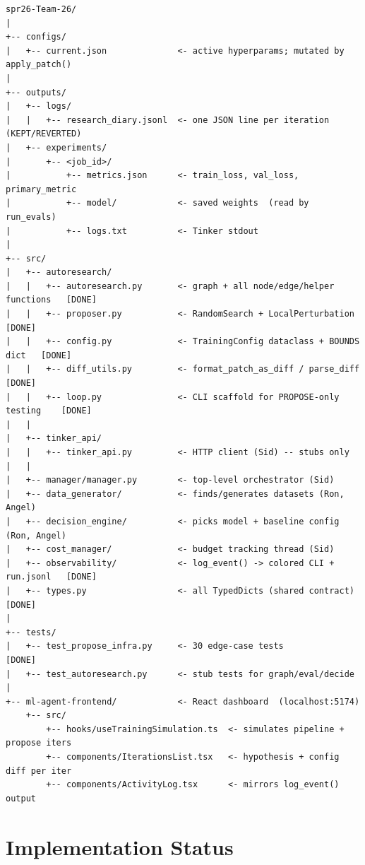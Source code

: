 \documentclass[11pt, letterpaper]{article}
\begin{document}
\begin{verbatim}
spr26-Team-26/
|
+-- configs/
|   +-- current.json              <- active hyperparams; mutated by apply_patch()
|
+-- outputs/
|   +-- logs/
|   |   +-- research_diary.jsonl  <- one JSON line per iteration (KEPT/REVERTED)
|   +-- experiments/
|       +-- <job_id>/
|           +-- metrics.json      <- train_loss, val_loss, primary_metric
|           +-- model/            <- saved weights  (read by run_evals)
|           +-- logs.txt          <- Tinker stdout
|
+-- src/
|   +-- autoresearch/
|   |   +-- autoresearch.py       <- graph + all node/edge/helper functions   [DONE]
|   |   +-- proposer.py           <- RandomSearch + LocalPerturbation         [DONE]
|   |   +-- config.py             <- TrainingConfig dataclass + BOUNDS dict   [DONE]
|   |   +-- diff_utils.py         <- format_patch_as_diff / parse_diff        [DONE]
|   |   +-- loop.py               <- CLI scaffold for PROPOSE-only testing    [DONE]
|   |
|   +-- tinker_api/
|   |   +-- tinker_api.py         <- HTTP client (Sid) -- stubs only
|   |
|   +-- manager/manager.py        <- top-level orchestrator (Sid)
|   +-- data_generator/           <- finds/generates datasets (Ron, Angel)
|   +-- decision_engine/          <- picks model + baseline config (Ron, Angel)
|   +-- cost_manager/             <- budget tracking thread (Sid)
|   +-- observability/            <- log_event() -> colored CLI + run.jsonl   [DONE]
|   +-- types.py                  <- all TypedDicts (shared contract)         [DONE]
|
+-- tests/
|   +-- test_propose_infra.py     <- 30 edge-case tests                       [DONE]
|   +-- test_autoresearch.py      <- stub tests for graph/eval/decide
|
+-- ml-agent-frontend/            <- React dashboard  (localhost:5174)
    +-- src/
        +-- hooks/useTrainingSimulation.ts  <- simulates pipeline + propose iters
        +-- components/IterationsList.tsx   <- hypothesis + config diff per iter
        +-- components/ActivityLog.tsx      <- mirrors log_event() output
\end{verbatim}

\section{Implementation Status}
\end{document}
